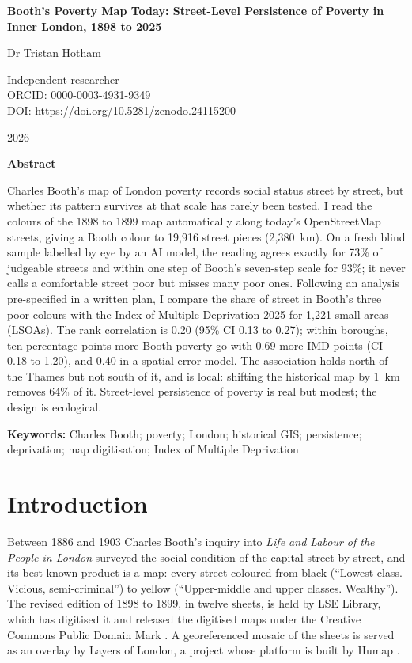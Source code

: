 \documentclass[11pt,a4paper]{article}
\begin{document}
\begin{center}
{\Large\bfseries Booth's Poverty Map Today: Street-Level Persistence of Poverty in Inner London, 1898 to 2025\par}
\vspace{1.2em}
{\large Dr Tristan Hotham\par}
\vspace{0.3em}
{\small Independent researcher\\
ORCID: 0000-0003-4931-9349\\
DOI: https://doi.org/10.5281/zenodo.24115200\par}
\vspace{0.8em}
2026
\end{center}

\begin{center}\textbf{Abstract}\end{center}
Charles Booth's map of London poverty records social status street by street, but whether its pattern survives at that scale has rarely been tested. I read the colours of the 1898 to 1899 map automatically along today's OpenStreetMap streets, giving a Booth colour to 19,916 street pieces (2,380~km). On a fresh blind sample labelled by eye by an AI model, the reading agrees exactly for 73\% of judgeable streets and within one step of Booth's seven-step scale for 93\%; it never calls a comfortable street poor but misses many poor ones. Following an analysis pre-specified in a written plan, I compare the share of street in Booth's three poor colours with the Index of Multiple Deprivation 2025 for 1,221 small areas (LSOAs). The rank correlation is 0.20 (95\% CI 0.13 to 0.27); within boroughs, ten percentage points more Booth poverty go with 0.69 more IMD points (CI 0.18 to 1.20), and 0.40 in a spatial error model. The association holds north of the Thames but not south of it, and is local: shifting the historical map by 1~km removes 64\% of it. Street-level persistence of poverty is real but modest; the design is ecological.

\textbf{Keywords:} Charles Booth; poverty; London; historical GIS; persistence; deprivation; map digitisation; Index of Multiple Deprivation

\section{Introduction}

Between 1886 and 1903 Charles Booth's inquiry into \textit{Life and Labour of the People in London} surveyed the social condition of the capital street by street, and its best-known product is a map: every street coloured from black (``Lowest class. Vicious, semi-criminal'') to yellow (``Upper-middle and upper classes. Wealthy''). The revised edition of 1898 to 1899, in twelve sheets, is held by LSE Library, which has digitised it and released the digitised maps under the Creative Commons Public Domain Mark \citep{lse_about, lse_maps}. A georeferenced mosaic of the sheets is served as an overlay by Layers of London, a project whose platform is built by Humap \citep{humap}.
\end{document}
